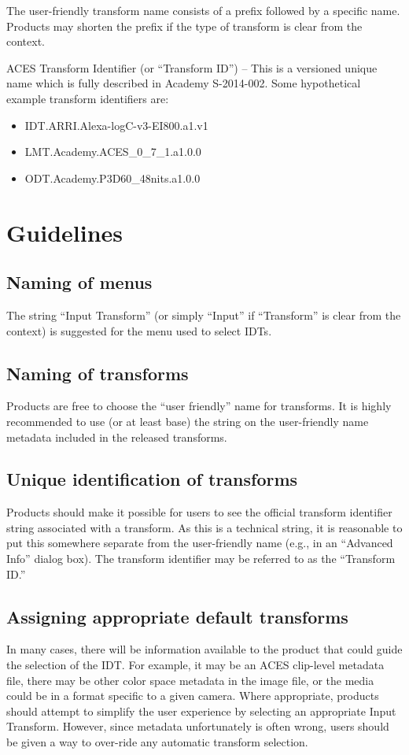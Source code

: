 The user-friendly transform name consists of a prefix followed by a specific name. Products may shorten the prefix if the type of transform is clear from the context.

ACES Transform Identifier (or ``Transform ID'') -- This is a versioned unique name which is fully described in Academy S-2014-002. Some hypothetical example transform identifiers are:

\begin{itemize} 
	\item IDT.ARRI.Alexa-logC-v3-EI800.a1.v1
	\item LMT.Academy.ACES\_0\_7\_1.a1.0.0
	\item ODT.Academy.P3D60\_48nits.a1.0.0	
\end{itemize}


\section{Guidelines}
\subsection{Naming of menus}
The string ``Input Transform'' (or simply ``Input'' if ``Transform'' is clear from the context) is suggested for the menu used to select IDTs. 

\subsection{Naming of transforms}
Products are free to choose the ``user friendly'' name for transforms. It is highly recommended to use (or at least base) the string on the user-friendly name metadata included in the released transforms. 

\subsection{Unique identification of transforms} \label{sec:uid1}
Products should make it possible for users to see the official transform identifier string associated with a transform. As this is a technical string, it is reasonable to put this somewhere separate from the user-friendly name (e.g., in an ``Advanced Info'' dialog box). The transform identifier may be referred to as the ``Transform ID.''

\subsection{Assigning appropriate default transforms}
In many cases, there will be information available to the product that could guide the selection of the IDT. For example, it may be an ACES clip-level metadata file, there may be other color space metadata in the image file, or the media could be in a format specific to a given camera. Where appropriate, products should attempt to simplify the user experience by selecting an appropriate Input Transform. However, since metadata unfortunately is often wrong, users should be given a way to over-ride any automatic transform selection.

